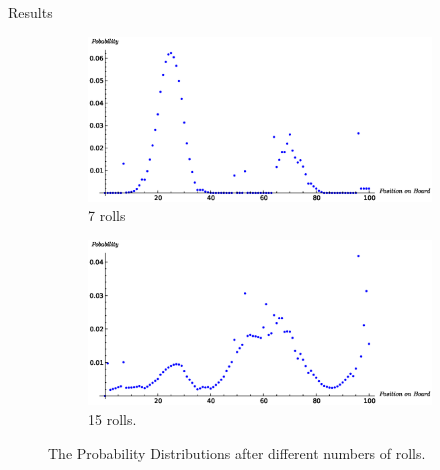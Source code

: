 \documentclass[14pt]{beamer}
\begin{document}
\begin{frame}{Results}
  \begin{figure}[!htbp]
    \centering
    \begin{subfigure}{.5\textwidth}
      \centering
      \includegraphics[width=\linewidth]{images/7plot}
      \caption{7 rolls}
    \end{subfigure}%
    \begin{subfigure}{.5\textwidth}
      \centering
      \includegraphics[width=\linewidth]{images/15plot}
      \caption{15 rolls.}
    \end{subfigure}
    \caption{The Probability Distributions after different numbers of rolls.}
  \end{figure}
\end{frame}
\end{document}
